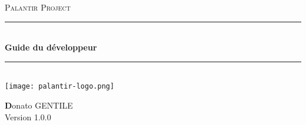 \begin{titlepage}

\newcommand{\HRule}{\rule{\linewidth}{0.5mm}}

\center
\textsc{\Large Palantir Project}\\[0.5cm]

\HRule \\[0.5cm]
{\huge \bfseries Guide du développeur}\\
\HRule \\[1.5cm]

\texttt{[image: palantir-logo.png]}\\[1cm]

\begin{center} 
\textbf Donato GENTILE\\
Version 1.0.0
\end{center}

\end{titlepage}
